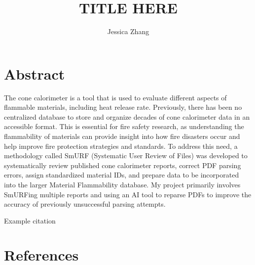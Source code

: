 \documentclass{abstract}
\title{TITLE HERE}
\author{Jessica Zhang}
\begin{document}
\maketitle
\section{Abstract}
The cone calorimeter is a tool that is used to evaluate different aspects of flammable materials, including heat release rate. Previously, there has been no centralized database to store and organize decades of cone calorimeter data in an accessible format. This is essential for fire safety research, as understanding the flammability of materials can provide insight into how fire disasters occur and help improve fire protection strategies and standards. To address this need, a methodology called SmURF (Systematic User Review of Files) was developed to systematically review published cone calorimeter reports, correct PDF parsing errors, assign standardized material IDs, and prepare data to be incorporated into the larger Material Flammability database. My project primarily involves SmURFing multiple reports and using an AI tool to reparse PDFs to improve the accuracy of previously unsuccessful parsing attempts.

Example citation \cite{babrauskas1982development, brown1988cone,emil1989flammability}


\section{References}
\printbibliography[heading=none]
\end{document}

